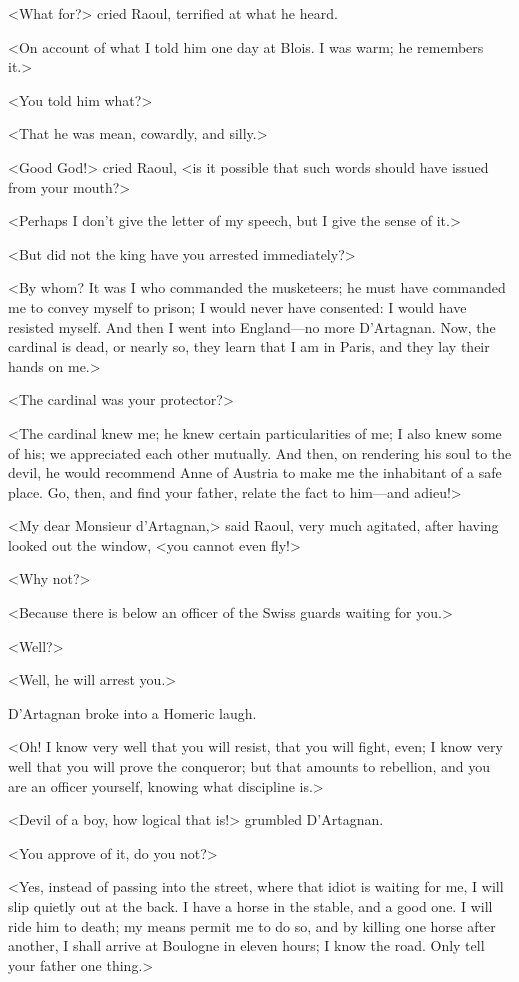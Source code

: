 <What for?> cried Raoul, terrified at what he heard.

<On account of what I told him one day at Blois. I was warm; he remembers it.>

<You told him what?>

<That he was mean, cowardly, and silly.>

<Good God!> cried Raoul, <is it possible that such words should have issued from your mouth?>

<Perhaps I don't give the letter of my speech, but I give the sense of it.>

<But did not the king have you arrested immediately?>

<By whom? It was I who commanded the musketeers; he must have commanded me to convey myself to prison; I would never have consented: I would have resisted myself. And then I went into England—no more D'Artagnan. Now, the cardinal is dead, or nearly so, they learn that I am in Paris, and they lay their hands on me.>

<The cardinal was your protector?>

<The cardinal knew me; he knew certain particularities of me; I also knew some of his; we appreciated each other mutually. And then, on rendering his soul to the devil, he would recommend Anne of Austria to make me the inhabitant of a safe place. Go, then, and find your father, relate the fact to him—and adieu!>

<My dear Monsieur d'Artagnan,> said Raoul, very much agitated, after having looked out the window, <you cannot even fly!>

<Why not?>

<Because there is below an officer of the Swiss guards waiting for you.>

<Well?>

<Well, he will arrest you.>

D'Artagnan broke into a Homeric laugh.

<Oh! I know very well that you will resist, that you will fight, even; I know very well that you will prove the conqueror; but that amounts to rebellion, and you are an officer yourself, knowing what discipline is.>

<Devil of a boy, how logical that is!> grumbled D'Artagnan.

<You approve of it, do you not?>

<Yes, instead of passing into the street, where that idiot is waiting for me, I will slip quietly out at the back. I have a horse in the stable, and a good one. I will ride him to death; my means permit me to do so, and by killing one horse after another, I shall arrive at Boulogne in eleven hours; I know the road. Only tell your father one thing.>

